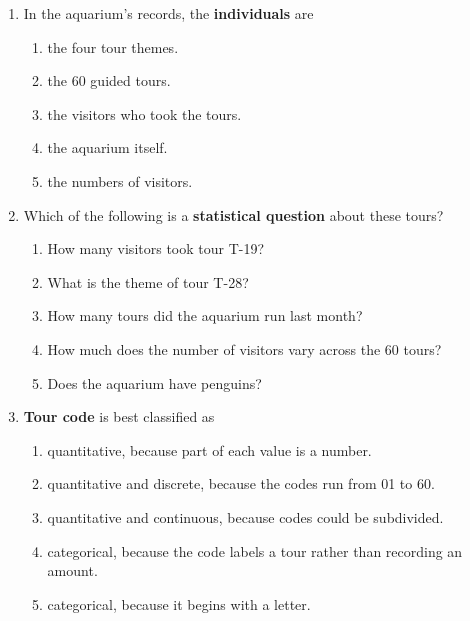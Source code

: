 \documentclass[12pt]{article}
\newcommand{\letterroom}{\rule[-15pt]{0pt}{36pt}}
\begin{document}
\begin{enumerate}[leftmargin=1.9em, itemsep=0.13in]

  \boxguard[9]
  \item In the aquarium's records, the \textbf{individuals} are
        \begin{enumerate}[label=\textbf{(\Alph*)}, leftmargin=2.2em, itemsep=2pt]
          \item the four tour themes.
          \item the 60 guided tours.
          \item the visitors who took the tours.
          \item the aquarium itself.
          \item the numbers of visitors.
                \hfill{}\letterroom
        \end{enumerate}

  \boxguard[9]
  \item Which of the following is a \textbf{statistical question} about these tours?
        \begin{enumerate}[label=\textbf{(\Alph*)}, leftmargin=2.2em, itemsep=2pt]
          \item How many visitors took tour T-19?
          \item What is the theme of tour T-28?
          \item How many tours did the aquarium run last month?
          \item How much does the number of visitors vary across the 60 tours?
          \item Does the aquarium have penguins?
                \hfill{}\letterroom
        \end{enumerate}

  \boxguard[9]
  \item \textbf{Tour code} is best classified as
        \begin{enumerate}[label=\textbf{(\Alph*)}, leftmargin=2.2em, itemsep=2pt]
          \item quantitative, because part of each value is a number.
          \item quantitative and discrete, because the codes run from 01 to 60.
          \item quantitative and continuous, because codes could be subdivided.
          \item categorical, because the code labels a tour rather than recording an amount.
          \item categorical, because it begins with a letter.
                \hfill{}\letterroom
        \end{enumerate}


\end{enumerate}
\end{document}

